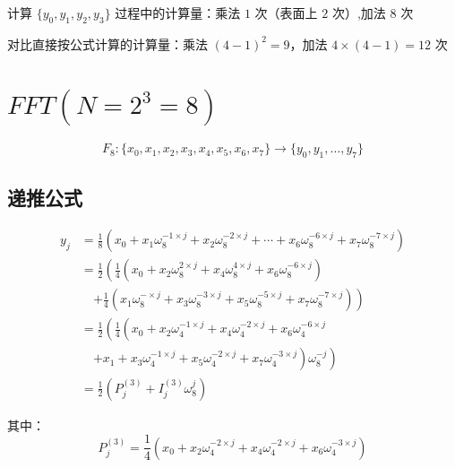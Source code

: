 \documentclass[linespread=1.5,openany]{book}%
\theoremstyle{plain}
\begin{document}
{{{					计算 $\{y_0, y_1,y_2, y_3\}$ 过程中的计算量：乘法 $1$ 次（表面上 $2$ 次）,加法 $8$ 次
					
					对比直接按公式计算的计算量：乘法 $(4-1)^2=9$，加法 $4 \times (4-1)=12$ 次
					\section{ $FFT (N=2^3=8)$}
					
					\begin{equation}
						F_8: \{x_0, x_1, x_2, x_3, x_4, x_5, x_6, x_7\} \rightarrow \{y_0, y_1, \ldots, y_7\}
					\end{equation}
					
					\subsection{递推公式}
					\begin{equation}
						\begin{aligned}
							y_j &= \frac{1}{8} \left( x_0 + x_1 \omega_8^{-1 \times j} + x_2 \omega_8^{-2 \times j} + \cdots + x_6 \omega_8^{-6 \times j} + x_7 \omega_8^{-7 \times j} \right) \\[8pt]
							&= \frac{1}{2} \left( \frac{1}{4} \left( x_0 + x_2 \omega_8^{2 \times j} + x_4 \omega_8^{4 \times j} + x_6 \omega_8^{-6 \times j} \right) \right. \\[8pt]
							&\quad \left. + \frac{1}{4} \left( x_1 \omega_8^{- \times j} + x_3 \omega_8^{-3 \times j} + x_5 \omega_8^{-5 \times j} + x_7 \omega_8^{-7 \times j} \right) \right) \\[8pt]
							&= \frac{1}{2} \left( \frac{1}{4} \left( x_0 + x_2 \omega_4^{- 1\times j} + x_4 \omega_4^{-2\times j} + x_6 \omega_4^{-6 \times j} \right. \right. \\[8pt]
							&\quad \left. \left. + x_1 + x_3 \omega_4^{-1 \times j} + x_5 \omega_4^{-2 \times j} + x_7 \omega_4^{-3 \times j} \right) \omega_8^{-j} \right) \\[8pt]
							&= \frac{1}{2} \left( P_j^{(3)} + I_j^{(3)} \omega_8^{j} \right)
						\end{aligned}
					\end{equation}
					
					
					其中：
					\begin{equation}
						P_j^{(3)} = \frac{1}{4} \left( x_0 + x_2 \omega_4^{-2 \times j} + x_4 \omega_4^{-2\times j} + x_6 \omega_4^{-3 \times j} \right)
					\end{equation}
					
}}}
\end{document}
